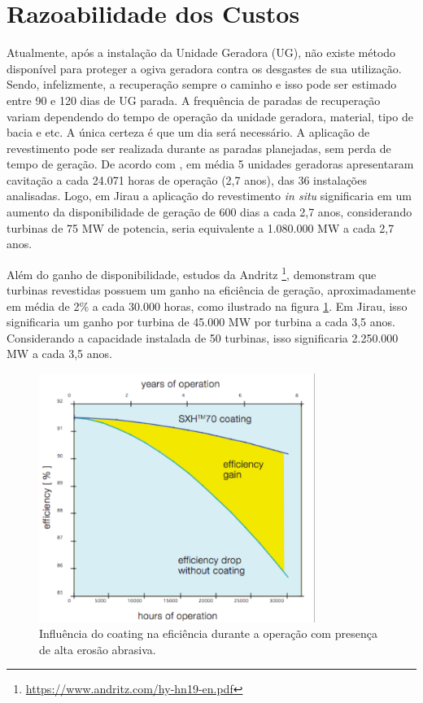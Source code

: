 \section{Razoabilidade dos Custos}

Atualmente, após a instalação da Unidade Geradora (UG), não existe método
disponível para proteger a ogiva geradora contra os desgastes de sua utilização. Sendo,
infelizmente, a recuperação sempre o caminho e isso pode ser estimado entre 90 e
120 dias de UG parada. A frequência de paradas de recuperação variam dependendo
do tempo de operação da unidade geradora, material, tipo de bacia e etc. A única
certeza é que um dia será necessário. A aplicação de revestimento pode ser realizada
durante as paradas planejadas, sem perda de tempo de geração.
De acordo com \cite{calainho1999cavitaccao}, em média 5 unidades geradoras
apresentaram  cavitação a cada 24.071 horas de operação (2,7 anos), das 36 instalações analisadas. Logo, em Jirau a
aplicação do revestimento \textit{in situ} significaria em um aumento da
disponibilidade de geração de 600 dias a cada 2,7 anos, considerando turbinas de 75 MW de
potencia, seria equivalente a 1.080.000 MW a cada 2,7 anos.

Além do ganho de disponibilidade, estudos da Andritz
\footnote{\url{https://www.andritz.com/hy-hn19-en.pdf}}, demonstram que turbinas
revestidas possuem um ganho na eficiência de geração, aproximadamente em média de 2\% a
cada 30.000 horas, como ilustrado na figura \ref{fig:coating_graph}. Em Jirau,
isso significaria um ganho por turbina de 45.000 MW por turbina a cada 3,5 anos. Considerando a capacidade instalada de
50 turbinas, isso significaria 2.250.000 MW a cada 3,5 anos.

\begin{figure}[h!]
\includegraphics[width=0.8\textwidth]{figs/coating_graph}
\caption{Influência do coating na eficiência durante a operação com presença de
alta erosão abrasiva.}
\label{fig:coating_graph}
\end{figure}

